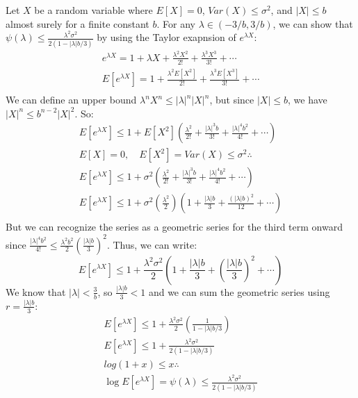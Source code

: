 \documentclass[11pt,a4paper,margin=1in]{article}
\begin{document}
\section{}
Let $X$ be a random variable where $E[X] = 0$, $Var(X) \leq \sigma^2$, and $|X| \leq b$
almost surely for a finite constant $b$. For any $\lambda \in (-3/b, 3/b)$, we can
show that $\psi(\lambda) \leq \frac{\lambda^2\sigma^2}{2(1 - |\lambda| b / 3)}$
by using the Taylor exapnsion of $e^{\lambda X}$:
\begin{gather*}
    e^{\lambda X} = 1 + \lambda X + \frac{\lambda^2 X^2}{2!} + \frac{\lambda^3 X^3}{3!} + \cdots \\
    E[e^{\lambda X}] = 1 + \frac{\lambda^2 E[X^2]}{2!} + \frac{\lambda^3 E[X^3]}{3!} + \cdots \\
\end{gather*}
We can define an upper bound $\lambda^n X^n \leq |\lambda|^n |X|^n$, but since
$|X| \leq b$, we have $|X|^n \leq b^{n - 2}|X|^2$. So:
\begin{gather*}
    E[e^{\lambda X}] \leq 1 + E[X^2] \left( \frac{\lambda^2}{2!} + \frac{|\lambda|^3 b}{3!} + \frac{|\lambda|^4 b^2}{4!} + \cdots \right) \\
    E[X] = 0, \quad E[X^2] = Var(X) \leq \sigma^2 \therefore \\
    E[e^{\lambda X}] \leq 1 + \sigma^2 \left( \frac{\lambda^2}{2!} + \frac{|\lambda|^3 b}{3!} + \frac{|\lambda|^4 b^2}{4!} + \cdots \right) \\
    E[e^{\lambda X}] \leq 1 + \sigma^2 \left( \frac{\lambda^2}{2} \right) \left(1 + \frac{|\lambda| b}{3} + \frac{(|\lambda| b)^2}{12} + \cdots \right) \\
\end{gather*}
But we can recognize the series as a geometric series for the third term onward
since $\frac{|\lambda|^4b^2}{4!} \leq \frac{\lambda^2b^2}{2} \left( \frac{|\lambda|b}{3} \right)^2$.
Thus, we can write:
\[
    E[e^{\lambda X}] \leq 1 + \frac{\lambda^2\sigma^2}{2} \left(1 + \frac{|\lambda| b}{3} + \left(\frac{|\lambda| b}{3}\right)^2 + \cdots \right)
\]
We know that $|\lambda| < \frac{3}{b}$, so $\frac{|\lambda| b}{3} < 1$ and we can 
sum the geometric series using $r = \frac{|\lambda| b}{3}$:
\begin{gather*}
    E[e^{\lambda X}] \leq 1 + \frac{\lambda^2\sigma^2}{2} \left( \frac{1}{1 - |\lambda| b / 3} \right) \\
    E[e^{\lambda X}] \leq 1 + \frac{\lambda^2\sigma^2}{2(1 - |\lambda| b / 3)} \\
    log(1 + x) \leq x \therefore \\
    \log E[e^{\lambda X}] = \psi(\lambda) \leq \frac{\lambda^2\sigma^2}{2(1 - |\lambda| b / 3)}
\end{gather*}
\end{document}
